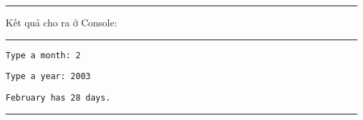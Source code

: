 \rule{\linewidth}{0.2mm}\par
\noindent
\resetlinenumber
Kết quả cho ra ở Console:\\
\rule{\linewidth}{0.2mm}\par
\begin{linenumbers}
	\texttt{Type a month: 2}\par
	\texttt{Type a year: 2003}\par
	\texttt{February has 28 days.}\par
\end{linenumbers}
\rule{\linewidth}{0.2mm}\par
\resetlinenumber
\newpage



